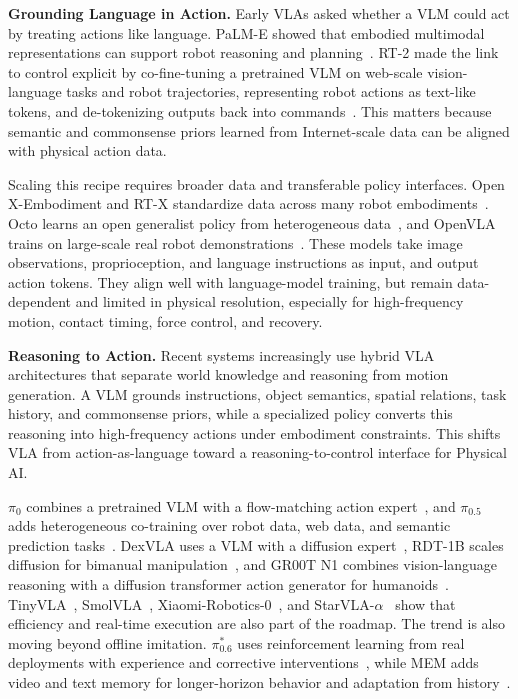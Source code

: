 \noindent\textbf{Grounding Language in Action.}
Early VLAs asked whether a VLM could act by treating actions like language.
PaLM-E showed that embodied multimodal representations can support robot reasoning and planning~\cite{driess2023palm}.
RT-2 made the link to control explicit by co-fine-tuning a pretrained VLM on web-scale vision-language tasks and robot trajectories, representing robot actions as text-like tokens, and de-tokenizing outputs back into commands~\cite{zitkovich2023rt}.
This matters because semantic and commonsense priors learned from Internet-scale data can be aligned with physical action data.

Scaling this recipe requires broader data and transferable policy interfaces.
Open X-Embodiment and RT-X standardize data across many robot embodiments~\cite{o2024open}.
Octo learns an open generalist policy from heterogeneous data~\cite{octo_2023}, and OpenVLA trains on large-scale real robot demonstrations~\cite{kim2024openvla}.
These models take image observations, proprioception, and language instructions as input, and output action tokens.
They align well with language-model training, but remain data-dependent and limited in physical resolution, especially for high-frequency motion, contact timing, force control, and recovery.

\noindent\textbf{Reasoning to Action.}
Recent systems increasingly use hybrid VLA architectures that separate world knowledge and reasoning from motion generation.
A VLM grounds instructions, object semantics, spatial relations, task history, and commonsense priors, while a specialized policy converts this reasoning into high-frequency actions under embodiment constraints.
This shifts VLA from action-as-language toward a reasoning-to-control interface for Physical AI.

$\pi_0$ combines a pretrained VLM with a flow-matching action expert~\cite{black2024pi0}, and $\pi_{0.5}$ adds heterogeneous co-training over robot data, web data, and semantic prediction tasks~\cite{physicalintelligence2025pi05}.
DexVLA uses a VLM with a diffusion expert~\cite{wen2025dexvla}, RDT-1B scales diffusion for bimanual manipulation~\cite{rdt1b2025}, and GR00T N1 combines vision-language reasoning with a diffusion transformer action generator for humanoids~\cite{bjorck2025gr00tn1}.
TinyVLA~\cite{wen2024tinyvla}, SmolVLA~\cite{shukor2025smolvla}, Xiaomi-Robotics-0~\cite{cai2026xiaomi}, and StarVLA-$\alpha$~\cite{ye2026starvla} show that efficiency and real-time execution are also part of the roadmap.
The trend is also moving beyond offline imitation.
$\pi^{*}_{0.6}$ uses reinforcement learning from real deployments with experience and corrective interventions~\cite{intelligence2025pi06vlalearnsexperience}, while MEM adds video and text memory for longer-horizon behavior and adaptation from history~\cite{torne2026mem}.



